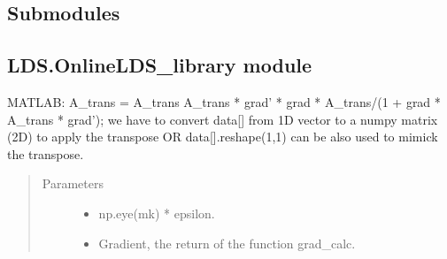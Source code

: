 \documentclass[letterpaper,10pt,english]{sphinxmanual}
\begin{document}
\subsection{Submodules}
\label{\detokenize{LDS:submodules}}

\subsection{LDS.OnlineLDS\_library module}
\label{\detokenize{LDS:module-LDS.OnlineLDS_library}}\label{\detokenize{LDS:lds-onlinelds-library-module}}

\begin{fulllineitems}
\label{\detokenize{LDS:LDS.OnlineLDS_library.A_trans_calc}}
\sphinxAtStartPar
MATLAB:
A\_trans = A\_trans \sphinxhyphen{} A\_trans * grad’ * grad * A\_trans/(1 + grad * A\_trans * grad’);
we have to convert data{[}{]} from 1D vector to a numpy matrix (2D) to apply the transpose
OR data{[}{]}.reshape(\sphinxhyphen{}1,1) can be also used to mimick the transpose.
\begin{quote}\begin{description}
\item[{Parameters}] \leavevmode\begin{itemize}
\item {} 
\sphinxAtStartPar
{} \textendash{} np.eye(mk) * epsilon.

\item {} 
\sphinxAtStartPar
{} \textendash{} Gradient, the return of the function grad\_calc.

\end{itemize}

\end{description}\end{quote}

\end{fulllineitems}

\end{document}
